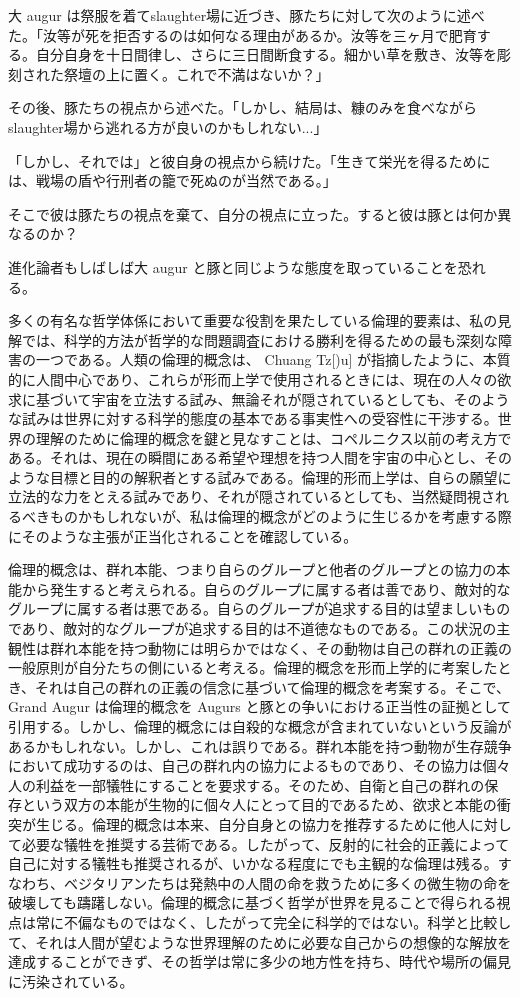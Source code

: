 \documentclass[a4paper,11pt,openany]{ltjsbook}
\begin{document}
大 augur は祭服を着てslaughter場に近づき、豚たちに対して次のように述べた。「汝等が死を拒否するのは如何なる理由があるか。汝等を三ヶ月で肥育する。自分自身を十日間律し、さらに三日間断食する。細かい草を敷き、汝等を彫刻された祭壇の上に置く。これで不満はないか？」

その後、豚たちの視点から述べた。「しかし、結局は、糠のみを食べながらslaughter場から逃れる方が良いのかもしれない...」

「しかし、それでは」と彼自身の視点から続けた。「生きて栄光を得るためには、戦場の盾や行刑者の籠で死ぬのが当然である。」

そこで彼は豚たちの視点を棄て、自分の視点に立った。すると彼は豚とは何か異なるのか？

進化論者もしばしば大 augur と豚と同じような態度を取っていることを恐れる。


多くの有名な哲学体係において重要な役割を果たしている倫理的要素は、私の見解では、科学的方法が哲学的な問題調査における勝利を得るための最も深刻な障害の一つである。人類の倫理的概念は、 Chuang Tz[)u] が指摘したように、本質的に人間中心であり、これらが形而上学で使用されるときには、現在の人々の欲求に基づいて宇宙を立法する試み、無論それが隠されているとしても、そのような試みは世界に対する科学的態度の基本である事実性への受容性に干渉する。世界の理解のために倫理的概念を鍵と見なすことは、コペルニクス以前の考え方である。それは、現在の瞬間にある希望や理想を持つ人間を宇宙の中心とし、そのような目標と目的の解釈者とする試みである。倫理的形而上学は、自らの願望に立法的な力をとえる試みであり、それが隠されているとしても、当然疑問視されるべきものかもしれないが、私は倫理的概念がどのように生じるかを考慮する際にそのような主張が正当化されることを確認している。

倫理的概念は、群れ本能、つまり自らのグループと他者のグループとの協力の本能から発生すると考えられる。自らのグループに属する者は善であり、敵対的なグループに属する者は悪である。自らのグループが追求する目的は望ましいものであり、敵対的なグループが追求する目的は不道徳なものである。この状況の主観性は群れ本能を持つ動物には明らかではなく、その動物は自己の群れの正義の一般原則が自分たちの側にいると考える。倫理的概念を形而上学的に考案したとき、それは自己の群れの正義の信念に基づいて倫理的概念を考案する。そこで、Grand Augur は倫理的概念を Augurs と豚との争いにおける正当性の証拠として引用する。しかし、倫理的概念には自殺的な概念が含まれていないという反論があるかもしれない。しかし、これは誤りである。群れ本能を持つ動物が生存競争において成功するのは、自己の群れ内の協力によるものであり、その協力は個々人の利益を一部犠牲にすることを要求する。そのため、自衛と自己の群れの保存という双方の本能が生物的に個々人にとって目的であるため、欲求と本能の衝突が生じる。倫理的概念は本来、自分自身との協力を推荐するために他人に対して必要な犠牲を推奨する芸術である。したがって、反射的に社会的正義によって自己に対する犠牲も推奨されるが、いかなる程度にでも主観的な倫理は残る。すなわち、ベジタリアンたちは発熱中の人間の命を救うために多くの微生物の命を破壊しても躊躇しない。倫理的概念に基づく哲学が世界を見ることで得られる視点は常に不偏なものではなく、したがって完全に科学的ではない。科学と比較して、それは人間が望むような世界理解のために必要な自己からの想像的な解放を達成することができず、その哲学は常に多少の地方性を持ち、時代や場所の偏見に汚染されている。
\end{document}
